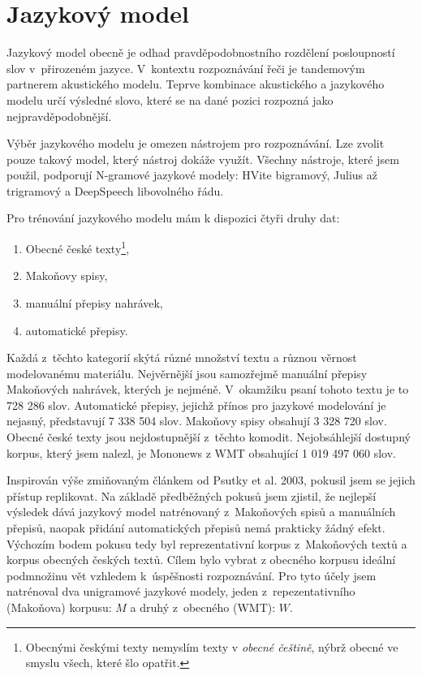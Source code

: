 \section{Jazykový model}
\label{sec:jazykovy-model}

Jazykový model obecně je odhad pravděpodobnostního rozdělení posloupností slov
v~přirozeném jazyce\cite{ponte1998language}. V~kontextu rozpoznávání řeči je tandemovým
partnerem akustického modelu\cite{jelinek1990self}. Teprve kombinace akustického
a jazykového modelu určí výsledné slovo, které se na dané pozici rozpozná jako
nejpravděpodobnější.

Výběr jazykového modelu je omezen nástrojem pro rozpoznávání. Lze zvolit pouze
takový model, který nástroj dokáže využít. Všechny nástroje, které jsem použil,
podporují N-gramové jazykové modely: HVite bigramový, Julius až trigramový a
DeepSpeech libovolného řádu.

Pro trénování jazykového modelu mám k dispozici čtyři druhy dat:
\begin{enumerate}
\item{Obecné české texty\footnote{Obecnými českými texty nemyslím texty v
{\em obecné češtině}, nýbrž obecné ve smyslu všech, které šlo opatřit.},}
\item{Makoňovy spisy,}
\item{manuální přepisy nahrávek,}
\item{automatické přepisy.}
\end{enumerate}

Každá z~těchto kategorií skýtá různé množství textu a různou věrnost
modelovanému materiálu. Nejvěrnější jsou samozřejmě manuální přepisy Makoňových
nahrávek, kterých je nejméně. V~okamžiku psaní tohoto textu je to 728 286
slov. Automatické přepisy, jejichž přínos pro jazykové modelování je nejasný,
představují 7 338 504 slov. Makoňovy spisy obsahují 3 328 720 slov. Obecné české
texty jsou nejdostupnější z~těchto komodit. Nejobsáhlejší dostupný korpus, který
jsem nalezl, je Mononews z WMT\cite{wmt19} obsahující 1 019 497 060 slov.

Inspirován výše zmiňovaným článkem od Psutky et al. 2003\cite{psutka2003large},
pokusil jsem se jejich přístup replikovat. Na základě předběžných pokusů jsem
zjistil, že nejlepší výsledek dává jazykový model natrénovaný z~Makoňových spisů
a manuálních přepisů, naopak přidání automatických přepisů nemá prakticky žádný
efekt. Výchozím bodem pokusu tedy byl reprezentativní korpus z~Makoňových textů
a korpus obecných českých textů. Cílem bylo vybrat z obecného korpusu ideální
podmnožinu vět vzhledem k~úspěšnosti rozpoznávání. Pro tyto účely jsem
natrénoval dva unigramové jazykové modely, jeden z~repezentativního (Makoňova)
korpusu: $M$ a druhý z~obecného (WMT): $W$.

